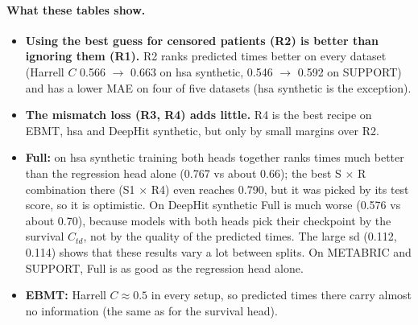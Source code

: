 \documentclass[11pt]{article}
\begin{document}
\paragraph{What these tables show.}
\begin{itemize}
  \item \textbf{Using the best guess for censored patients (R2) is better than ignoring them (R1).}
        R2 ranks predicted times better on every dataset (Harrell $C$ 0.566 $\rightarrow$ 0.663 on hsa
        synthetic, 0.546 $\rightarrow$ 0.592 on SUPPORT) and has a lower MAE on four of five datasets
        (hsa synthetic is the exception).
  \item \textbf{The mismatch loss (R3, R4) adds little.} R4 is the best recipe on EBMT, hsa and DeepHit
        synthetic, but only by small margins over R2.
  \item \textbf{Full:} on hsa synthetic training both heads together ranks times much
        better than the regression head alone (0.767 vs about 0.66); the best S $\times$ R combination
        there (S1 $\times$ R4) even reaches 0.790, but it was picked by its test score, so it is optimistic.
        On DeepHit synthetic Full is much worse (0.576 vs about 0.70), because models with both heads
        pick their checkpoint by the survival $C_{td}$, not by the quality of the predicted times.
        The large sd (0.112, 0.114) shows that these results vary a lot between splits.
        On METABRIC and SUPPORT, Full is as good as the regression head alone.
  \item \textbf{EBMT:} Harrell $C \approx 0.5$ in every setup, so predicted times there carry almost
        no information (the same as for the survival head).
\end{itemize}
\end{document}
